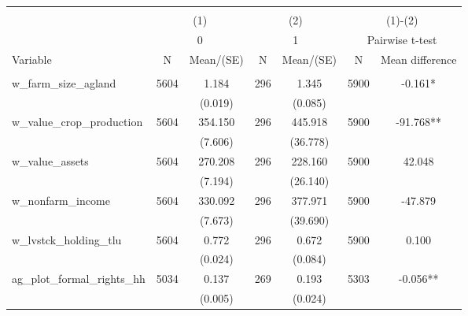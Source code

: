
\begin{tabular}{@{\extracolsep{5pt}}lcccccc}
\\[-1.8ex]\hline \hline \\[-1.8ex]
 & \multicolumn{2}{c}{(1)}  & \multicolumn{2}{c}{(2)}  & \multicolumn{2}{c}{(1)-(2)} \\
 & \multicolumn{2}{c}{0}  & \multicolumn{2}{c}{1}  & \multicolumn{2}{c}{Pairwise t-test}  \\
Variable & N & Mean/(SE) & N & Mean/(SE) & N & Mean difference \\ \hline \\[-1.8ex] 
w\_farm\_size\_agland   & 5604    & 1.184    & 296    & 1.345    & 5900    & -0.161*   \\
 &   & (0.019)  &   & (0.085)  &   &  \\ [1ex]
w\_value\_crop\_production   & 5604    & 354.150    & 296    & 445.918    & 5900    & -91.768**   \\
 &   & (7.606)  &   & (36.778)  &   &  \\ [1ex]
w\_value\_assets   & 5604    & 270.208    & 296    & 228.160    & 5900    & 42.048   \\
 &   & (7.194)  &   & (26.140)  &   &  \\ [1ex]
w\_nonfarm\_income   & 5604    & 330.092    & 296    & 377.971    & 5900    & -47.879   \\
 &   & (7.673)  &   & (39.690)  &   &  \\ [1ex]
w\_lvstck\_holding\_tlu   & 5604    & 0.772    & 296    & 0.672    & 5900    & 0.100   \\
 &   & (0.024)  &   & (0.084)  &   &  \\ [1ex]
ag\_plot\_formal\_rights\_hh   & 5034    & 0.137    & 269    & 0.193    & 5303    & -0.056**   \\
 &   & (0.005)  &   & (0.024)  &   &  \\ [1ex]

\end{tabular}
